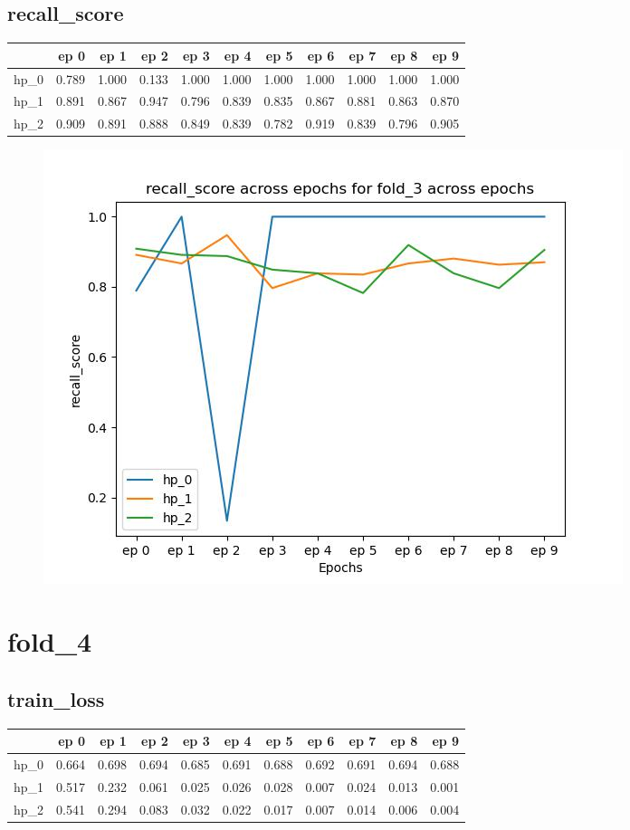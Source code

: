 \documentclass{article}
\begin{document}
\subsection{recall\_score}
\begin{tabular}{lrrrrrrrrrr}
\toprule
{} &   ep 0 &   ep 1 &   ep 2 &   ep 3 &   ep 4 &   ep 5 &   ep 6 &   ep 7 &   ep 8 &   ep 9 \\
\midrule
hp\_0 &  0.789 &  1.000 &  0.133 &  1.000 &  1.000 &  1.000 &  1.000 &  1.000 &  1.000 &  1.000 \\
hp\_1 &  0.891 &  0.867 &  0.947 &  0.796 &  0.839 &  0.835 &  0.867 &  0.881 &  0.863 &  0.870 \\
hp\_2 &  0.909 &  0.891 &  0.888 &  0.849 &  0.839 &  0.782 &  0.919 &  0.839 &  0.796 &  0.905 \\
\bottomrule
\end{tabular}

\begin{figure}[H]
\includegraphics[scale = 0.75]{fold_3/recall_score}
\end{figure}
\section{fold\_4}
\subsection{train\_loss}
\begin{tabular}{lrrrrrrrrrr}
\toprule
{} &   ep 0 &   ep 1 &   ep 2 &   ep 3 &   ep 4 &   ep 5 &   ep 6 &   ep 7 &   ep 8 &   ep 9 \\
\midrule
hp\_0 &  0.664 &  0.698 &  0.694 &  0.685 &  0.691 &  0.688 &  0.692 &  0.691 &  0.694 &  0.688 \\
hp\_1 &  0.517 &  0.232 &  0.061 &  0.025 &  0.026 &  0.028 &  0.007 &  0.024 &  0.013 &  0.001 \\
hp\_2 &  0.541 &  0.294 &  0.083 &  0.032 &  0.022 &  0.017 &  0.007 &  0.014 &  0.006 &  0.004 \\
\bottomrule
\end{tabular}
\end{document}
